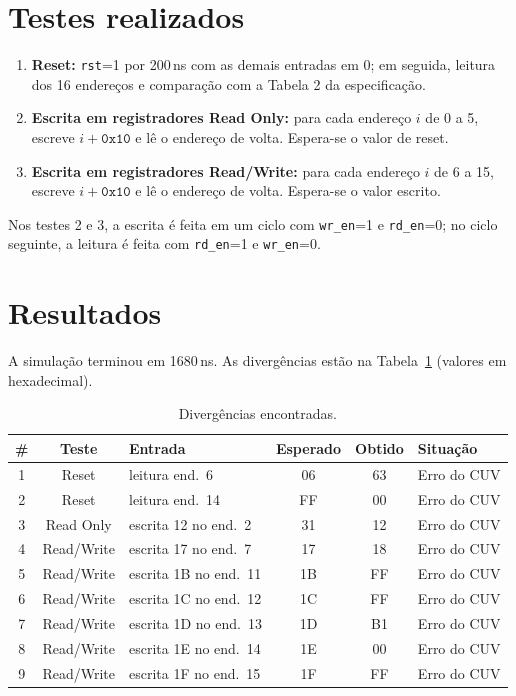 \documentclass[a4paper,11pt]{article}
\begin{document}
\section{Testes realizados}

\begin{enumerate}
    \item \textbf{Reset:} \texttt{rst}=1 por 200\,ns com as demais entradas em 0; em seguida,
          leitura dos 16 endereços e comparação com a Tabela 2 da especificação.
    \item \textbf{Escrita em registradores Read Only:} para cada endereço $i$ de 0 a 5, escreve
          $i + \texttt{0x10}$ e lê o endereço de volta. Espera-se o valor de reset.
    \item \textbf{Escrita em registradores Read/Write:} para cada endereço $i$ de 6 a 15, escreve
          $i + \texttt{0x10}$ e lê o endereço de volta. Espera-se o valor escrito.
\end{enumerate}

Nos testes 2 e 3, a escrita é feita em um ciclo com \texttt{wr\_en}=1 e \texttt{rd\_en}=0; no ciclo
seguinte, a leitura é feita com \texttt{rd\_en}=1 e \texttt{wr\_en}=0.

\section{Resultados}

A simulação terminou em 1680\,ns. As divergências estão na Tabela~\ref{tab:res}
(valores em hexadecimal).

\begin{table}[h]
\centering
\begin{tabular}{c c l c c l}
\toprule
\textbf{\#} & \textbf{Teste} & \textbf{Entrada} & \textbf{Esperado} & \textbf{Obtido} & \textbf{Situação} \\
\midrule
1  & Reset      & leitura end.\ 6               & 06 & 63 & Erro do CUV \\
2  & Reset      & leitura end.\ 14              & FF & 00 & Erro do CUV \\
3  & Read Only  & escrita 12 no end.\ 2         & 31 & 12 & Erro do CUV \\
4  & Read/Write & escrita 17 no end.\ 7         & 17 & 18 & Erro do CUV \\
5  & Read/Write & escrita 1B no end.\ 11        & 1B & FF & Erro do CUV \\
6  & Read/Write & escrita 1C no end.\ 12        & 1C & FF & Erro do CUV \\
7  & Read/Write & escrita 1D no end.\ 13        & 1D & B1 & Erro do CUV \\
8  & Read/Write & escrita 1E no end.\ 14        & 1E & 00 & Erro do CUV \\
9  & Read/Write & escrita 1F no end.\ 15        & 1F & FF & Erro do CUV \\
\bottomrule
\end{tabular}
\caption{Divergências encontradas.}
\label{tab:res}
\end{table}
\end{document}
